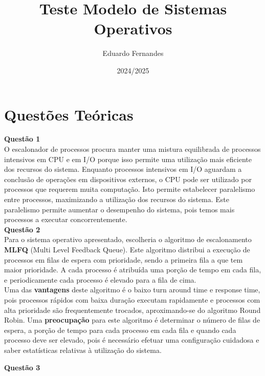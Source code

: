 \documentclass[a4paper, 11pt]{article}
\title{Teste Modelo de Sistemas Operativos}
\author{Eduardo Fernandes}
\date{2024/2025}
\begin{document}
\maketitle


\section*{Questões Teóricas}

\noindent \textbf{Questão 1}\\

\noindent O escalonador de processos procura manter uma mistura equilibrada de processos intensivos em CPU e em I/O porque isso permite uma utilização mais eficiente dos recursos do sistema. Enquanto processos intensivos em I/O aguardam a conclusão de operações em dispositivos externos, o CPU pode ser utilizado por processos que requerem muita computação. Isto permite estabelecer paralelismo entre processos, maximizando a utilização dos recursos do sistema. Este paralelismo permite aumentar o desempenho do sistema, pois temos mais processos a executar concorrentemente.\\


\noindent \textbf{Questão 2}\\

\noindent Para o sistema operativo apresentado, escolheria o algoritmo de escalonamento \textbf{MLFQ} (Multi Level Feedback Queue). Este algoritmo distribui a execução de processos em filas de espera com prioridade, sendo a primeira fila a que tem maior prioridade. A cada processo é atribuída uma porção de tempo em cada fila, e periodicamente cada processo é elevado para a fila de cima.\\

\noindent Uma das \textbf{vantagens} deste algoritmo é o baixo turn around time e response time, pois processos rápidos com baixa duração executam rapidamente e processos com alta prioridade são frequentemente trocados, aproximando-se do algoritmo Round Robin. Uma \textbf{preocupação} para este algoritmo é determinar o número de filas de espera, a porção de tempo para cada processo em cada fila e quando cada processo deve ser elevado, pois é necessário efetuar uma configuração cuidadosa e saber estatísticas relativas à utilização do sistema.

\newpage

\noindent \textbf{Questão 3}
\end{document}
